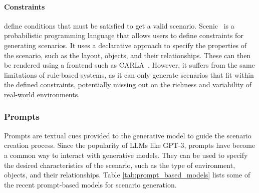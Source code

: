 \documentclass{article}
\begin{document}
\paragraph{Constraints} define conditions that must be satisfied to get a valid scenario. Scenic~\cite{fremont2019scenic} is a probabilistic programming language that allows users to define constraints for generating scenarios. It uses a declarative approach to specify the properties of the scenario, such as the layout, objects, and their relationships. These can then be rendered using a frontend such as CARLA~\cite{dosovitskiy2017carla}. However, it suffers from the same limitations of rule-based systems, as it can only generate scenarios that fit within the defined constraints, potentially missing out on the richness and variability of real-world environments.

\subsubsection{Prompts}

Prompts are textual cues provided to the generative model to guide the scenario creation process. Since the popularity of LLMs like GPT-3, prompts have become a common way to interact with generative models. They can be used to specify the desired characteristics of the scenario, such as the type of environment, objects, and their relationships. Table \ref{tab:prompt_based_models} lists some of the recent prompt-based models for scenario generation.
\end{document}
